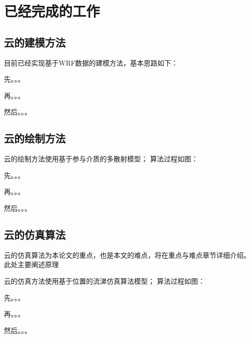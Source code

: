 \chapter{已经完成的工作}

\section{云的建模方法}
目前已经实现基于WRF数据的建模方法，基本思路如下：

先。。。

再。。。

然后。。。

\section{云的绘制方法}

云的绘制方法使用基于参与介质的多散射模型；
算法过程如图：

先。。。

再。。。

然后。。。

\section{云的仿真算法}

云的仿真算法为本论文的重点，也是本文的难点，将在重点与难点章节详细介绍。此处主要阐述原理

云的仿真方法使用基于位置的流涕仿真算法模型；
算法过程如图：

先。。。

再。。。

然后。。。



